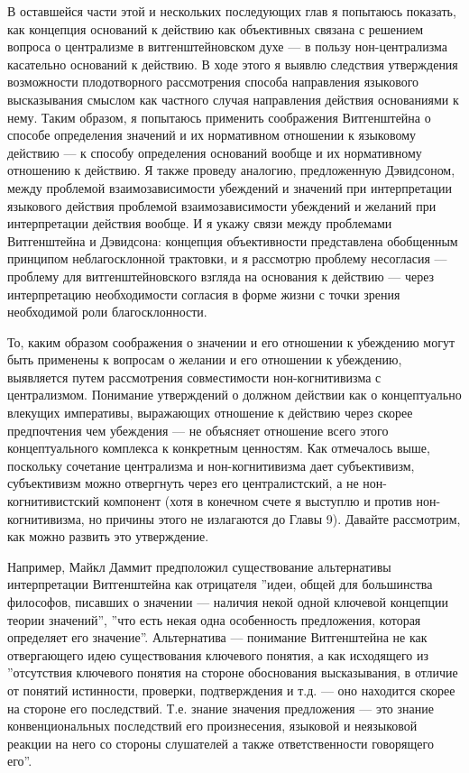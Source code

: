 \documentclass[11pt]{book}
\begin{document}
В оставшейся части этой и нескольких последующих глав я попытаюсь показать, как концепция оснований к действию как объективных связана с решением вопроса о централизме в витгенштейновском духе --- в пользу нон-централизма касательно оснований к действию. В ходе этого я выявлю следствия утверждения возможности плодотворного рассмотрения способа направления языкового высказывания смыслом как частного случая направления действия основаниями к нему. Таким образом, я попытаюсь применить соображения Витгенштейна о способе определения значений и их нормативном отношении к языковому действию --- к способу определения оснований вообще и их нормативному отношению к действию. Я также проведу аналогию, предложенную Дэвидсоном, между проблемой взаимозависимости убеждений и значений при интерпретации языкового действия проблемой взаимозависимости убеждений и желаний при интерпретации действия вообще. И я укажу связи между проблемами Витгенштейна и Дэвидсона: концепция объективности представлена обобщенным принципом неблагосклонной трактовки, и я рассмотрю проблему несогласия --- проблему для витгенштейновского взгляда на основания к действию --- через интерпретацию необходимости согласия в форме жизни с точки зрения необходимой роли благосклонности.

То, каким образом соображения о значении и его отношении к убеждению могут быть применены к вопросам о желании и его отношении к убеждению, выявляется путем рассмотрения совместимости нон-когнитивизма с централизмом. Понимание утверждений о должном действии как о концептуально влекущих императивы, выражающих отношение к действию через скорее предпочтения чем убеждения --- не объясняет отношение всего этого концептуального комплекса к конкретным ценностям. Как отмечалось выше, поскольку сочетание централизма и нон-когнитивизма дает субъективизм, субъективизм можно отвергнуть через его централистский, а не нон-когнитивистский компонент (хотя в конечном счете я выступлю и против нон-когнитивизма, но причины этого не излагаются до Главы 9). Давайте рассмотрим, как можно развить это утверждение.

Например, Майкл Даммит предположил существование альтернативы интерпретации Витгенштейна как отрицателя ''идеи, общей для большинства философов, писавших о значении --- наличия некой одной ключевой концепции теории значений'', ''что есть некая одна особенность предложения, которая определяет его значение''. Альтернатива --- понимание Витгенштейна не как отвергающего идею существования ключевого понятия, а как исходящего из ''отсутствия ключевого понятия на стороне обоснования высказывания, в отличие от понятий истинности, проверки, подтверждения и т.д. --- оно находится скорее на стороне его последствий. Т.е. знание значения предложения --- это знание конвенциональных последствий его произнесения, языковой и неязыковой реакции на него со стороны слушателей а также ответственности говорящего его''.
\end{document}
